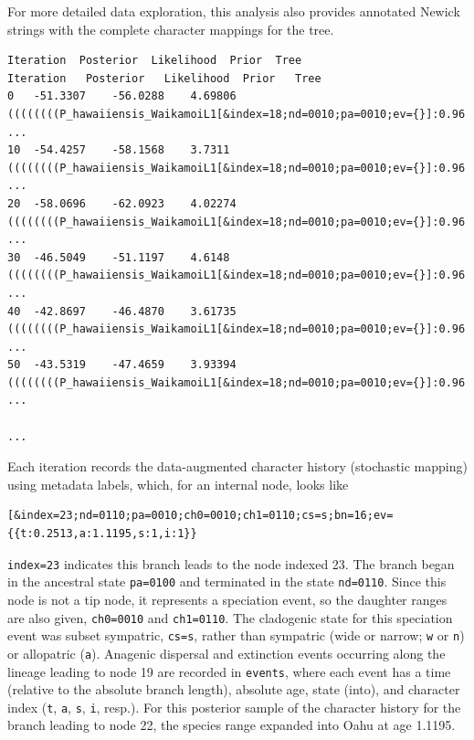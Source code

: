 For more detailed data exploration, this analysis also provides annotated Newick strings with the complete character mappings for the tree.


\begin{framed}
\begin{lstlisting}
Iteration  Posterior  Likelihood  Prior  Tree
Iteration	Posterior	Likelihood	Prior	Tree
0	-51.3307	-56.0288	4.69806	((((((((P_hawaiiensis_WaikamoiL1[&index=18;nd=0010;pa=0010;ev={}]:0.96 ...
10	-54.4257	-58.1568	3.7311	((((((((P_hawaiiensis_WaikamoiL1[&index=18;nd=0010;pa=0010;ev={}]:0.96 ...
20	-58.0696	-62.0923	4.02274	((((((((P_hawaiiensis_WaikamoiL1[&index=18;nd=0010;pa=0010;ev={}]:0.96 ...
30	-46.5049	-51.1197	4.6148	((((((((P_hawaiiensis_WaikamoiL1[&index=18;nd=0010;pa=0010;ev={}]:0.96 ...
40	-42.8697	-46.4870	3.61735	((((((((P_hawaiiensis_WaikamoiL1[&index=18;nd=0010;pa=0010;ev={}]:0.96 ...
50	-43.5319	-47.4659	3.93394	((((((((P_hawaiiensis_WaikamoiL1[&index=18;nd=0010;pa=0010;ev={}]:0.96 ...

...
\end{lstlisting}
\end{framed}

Each iteration records the data-augmented character history (stochastic mapping) using metadata labels, which, for an internal node, looks like

\begin{snugshade}
\begin{lstlisting}
[&index=23;nd=0110;pa=0010;ch0=0010;ch1=0110;cs=s;bn=16;ev={{t:0.2513,a:1.1195,s:1,i:1}}
\end{lstlisting}
\end{snugshade}

{\tt index=23} indicates this branch leads to the node indexed 23.
The branch began in the ancestral state {\tt pa=0100} and terminated in the state {\tt nd=0110}.
Since this node is not a tip node, it represents a speciation event, so the daughter ranges are also given, {\tt ch0=0010} and {\tt ch1=0110}.
The cladogenic state for this speciation event was subset sympatric, {\tt cs=s}, rather than sympatric (wide or narrow; {\tt w} or  {\tt n}) or allopatric ({\tt a}).
Anagenic dispersal and extinction events occurring along the lineage leading to node 19 are recorded in {\tt events}, where each event has a time (relative to the absolute branch length), absolute age, state (into), and character index ({\tt t}, {\tt a}, {\tt s}, {\tt i}, resp.).
For this posterior sample of the character history for the branch leading to node 22, the species range expanded into Oahu at age 1.1195.

